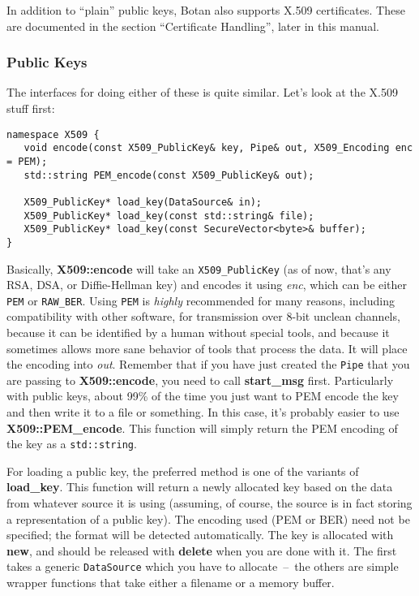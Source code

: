 \documentclass{article}
\newcommand{\function}[1]{\textbf{#1}}
\newcommand{\type}[1]{\texttt{#1}}
\renewcommand{\arg}[1]{\textsl{#1}}
\begin{document}
In addition to ``plain'' public keys, Botan also supports X.509 certificates.
These are documented in the section ``Certificate Handling'', later in this
manual.

\subsubsection{Public Keys}

The interfaces for doing either of these is quite similar. Let's look at the
X.509 stuff first:
\begin{verbatim}
namespace X509 {
   void encode(const X509_PublicKey& key, Pipe& out, X509_Encoding enc = PEM);
   std::string PEM_encode(const X509_PublicKey& out);

   X509_PublicKey* load_key(DataSource& in);
   X509_PublicKey* load_key(const std::string& file);
   X509_PublicKey* load_key(const SecureVector<byte>& buffer);
}
\end{verbatim}

Basically, \function{X509::encode} will take an \type{X509\_PublicKey} (as of
now, that's any RSA, DSA, or Diffie-Hellman key) and encodes it using
\arg{enc}, which can be either \type{PEM} or \type{RAW\_BER}. Using \type{PEM}
is \emph{highly} recommended for many reasons, including compatibility with
other software, for transmission over 8-bit unclean channels, because it can be
identified by a human without special tools, and because it sometimes allows
more sane behavior of tools that process the data. It will place the encoding
into \arg{out}. Remember that if you have just created the \type{Pipe} that you
are passing to \function{X509::encode}, you need to call \function{start\_msg}
first. Particularly with public keys, about 99\% of the time you just want to
PEM encode the key and then write it to a file or something. In this case, it's
probably easier to use \function{X509::PEM\_encode}. This function will simply
return the PEM encoding of the key as a \type{std::string}.

For loading a public key, the preferred method is one of the variants of
\function{load\_key}. This function will return a newly allocated key based on
the data from whatever source it is using (assuming, of course, the source is
in fact storing a representation of a public key). The encoding used (PEM or
BER) need not be specified; the format will be detected automatically. The key
is allocated with \function{new}, and should be released with \function{delete}
when you are done with it. The first takes a generic \type{DataSource} which
you have to allocate~--~the others are simple wrapper functions that take
either a filename or a memory buffer.
\end{document}
